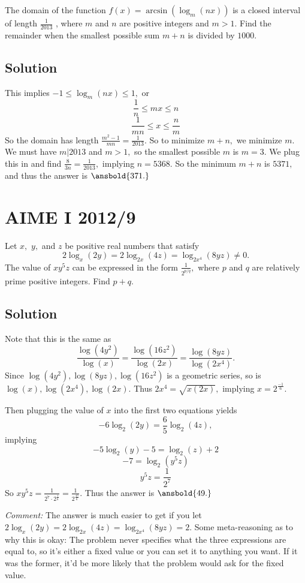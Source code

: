 \documentclass{article}
\begin{document}
The domain of the function $f(x) = \arcsin(\log_{m}(nx))$ is a closed interval of length $\frac{1}{2013}$ , where $m$ and $n$ are positive integers and $m>1$. Find the remainder when the smallest possible sum $m+n$ is divided by $1000.$

\subsection{Solution}

This implies $-1\leq \log_m(nx)\leq 1,$ or
    \[\frac{1}{n}\leq mx\leq n\]
    \[\frac{1}{mn}\leq x\leq \frac{n}{m}\]
    So the domain has length $\frac{m^2-1}{mn}=\frac{1}{2013}.$ So to minimize $m+n,$ we minimize $m.$ We must have $m|2013$ and $m>1,$ so the smallest possible $m$ is $m=3.$ We plug this in and find $\frac{8}{3n}=\frac{1}{2013},$ implying $n=5368.$ So the minimum $m+n$ is $5371,$ and thus the answer is $\ansbold{371.}$

\pagebreak\section{AIME I 2012/9}

Let $x,$ $y,$ and $z$ be positive real numbers that satisfy \[2\log_{x}(2y) = 2\log_{2x}(4z) = \log_{2x^4}(8yz) \ne 0.\] The value of $xy^5z$ can be expressed in the form $\frac{1}{2^{p/q}},$ where $p$ and $q$ are relatively prime positive integers. Find $p+q.$

\subsection{Solution}

Note that this is the same as
    \[\frac{\log(4y^2)}{\log(x)}=\frac{\log(16z^2)}{\log(2x)}=\frac{\log(8yz)}{\log(2x^4)}.\]
    Since $\log(4y^2),\log(8yz),\log(16z^2)$ is a geometric series, so is $\log(x),\log(2x^4),\log(2x).$ Thus $2x^4=\sqrt{x(2x)},$ implying $x=2^{\frac{-1}{6}}.$

    Then plugging the value of $x$ into the first two equations yields
    \[-6\log_{2}(2y)=\frac{6}{5}\log_{2}(4z),\]
    implying
    \[-5\log_{2}(y)-5=\log_{2}(z)+2\]
    \[-7=\log_{2}(y^5z)\]
    \[y^5z=\frac{1}{2^7}\]
    So $xy^5z=\frac{1}{2^7\cdot 2^{\frac{1}{6}}}=\frac{1}{2^{\frac{43}{6}}}.$ Thus the answer is $\ansbold{49.}$

\textit{Comment:} The answer is much easier to get if you let $2\log_{x}(2y) = 2\log_{2x}(4z) = \log_{2x^4}(8yz)=2.$ Some meta-reasoning as to why this is okay: The problem never specifies what the three expressions are equal to, so it's either a fixed value or you can set it to anything you want. If it was the former, it'd be more likely that the problem would ask for the fixed value.
\end{document}
